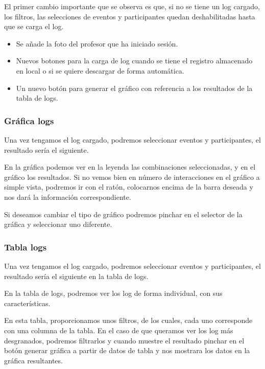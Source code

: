 El primer cambio importante que se observa es que, si no se tiene un log cargado, los filtros, las selecciones de eventos y participantes quedan deshabilitadas hasta que se carga el log.

\begin{itemize}
	\tightlist
	\item
	Se añade la foto del profesor que ha iniciado sesión.
	\item
	Nuevos botones para la carga de log cuando se tiene el registro almacenado en local o si se quiere descargar de forma automática.
	\item
	Un nuevo botón para generar el gráfico con referencia a los resultados de la tabla de logs.
\end{itemize}

\subsubsection{Gráfica logs}\label{grafica-logs}

Una vez tengamos el log cargado, podremos seleccionar eventos y participantes, el resultado sería el siguiente.


En la gráfica podemos ver en la leyenda las combinaciones seleccionadas, y en el gráfico los resultados. Si no vemos bien en número de interacciones en el gráfico a simple vista, podremos ir con el ratón, colocarnos encima de la barra deseada y nos dará la información correspondiente.

Si deseamos cambiar el tipo de gráfico podremos pinchar en el selector de la gráfica y seleccionar uno diferente.

\subsubsection{Tabla logs}\label{tabla-logs}

Una vez tengamos el log cargado, podremos seleccionar eventos y participantes, el resultado sería el siguiente en la tabla de logs.


En la tabla de logs, podremos ver los log de forma individual, con sus características.

En esta tabla, proporcionamos unos filtros, de los cuales, cada uno corresponde con una columna de la tabla. En el caso de que queramos ver los log más desgranados, podremos filtrarlos y cuando muestre el resultado pinchar en el botón generar gráfica a partir de datos de tabla y nos mostrara los datos en la gráfica resultantes.



















